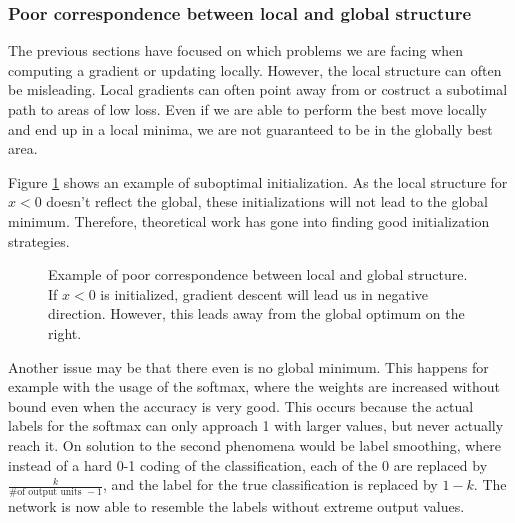 \subsubsection{Poor correspondence between local and global
structure}\label{prob:5}

The previous sections have focused on which problems we are facing when
computing a gradient or updating locally. However, the local structure can often
be misleading. Local gradients can often point away from  or costruct a
subotimal path to areas of low loss. Even if we are able to perform the best
move locally and end up in a local minima, we are not guaranteed to be in the
globally best area. 

Figure \ref{fig:Poor_correspondence}
shows an example of suboptimal initialization. As the local structure for $x<0$
doesn't reflect the global, these initializations will not lead to the global
minimum. Therefore, theoretical work has gone into finding good initialization
strategies.

\begin{figure}[h]\label{fig:Poor_correspondence}
    \begin{center}
        \caption{Example of poor correspondence between local and global
        structure. If $x<0$ is initialized, gradient descent will lead us in
        negative direction. However, this leads away from the global optimum
        on the right.}
    \end{center}
\end{figure}

Another issue may be that there even is no global minimum. This happens for
example with the usage of the softmax, where the weights are increased without
bound even when the accuracy is very good. This occurs because the actual labels
for the softmax can only approach 1 with larger values, but never actually reach
it.  On solution to the second phenomena would be label smoothing, where instead
of a hard 0-1 coding of the classification, each of the 0 are replaced by
$\frac{k}{\textrm{\# of output units }-1}$, and the label for the true
classification is replaced by $1-k$. The network is now able to
resemble the labels without extreme output values.


